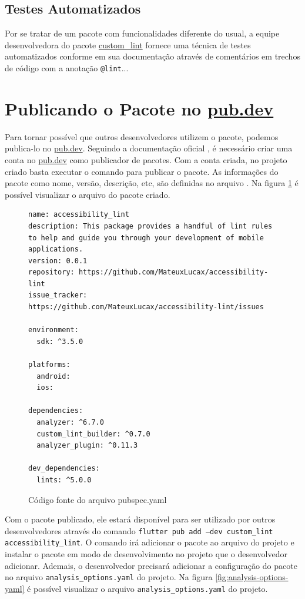 \subsection{Testes Automatizados}

Por se tratar de um pacote com funcionalidades diferente do usual, a equipe desenvolvedora do pacote \href{https://pub.dev/packages/custom_lint}{custom\_lint} fornece uma técnica de testes automatizados conforme em sua documentação \cite{customlintbuilder} através de comentários em trechos de código com a anotação \texttt{@lint}...

\section{Publicando o Pacote no \href{https://pub.dev/}{pub.dev}}

Para tornar possível que outros desenvolvedores utilizem o pacote, podemos publica-lo no \href{https://pub.dev/}{pub.dev}. Seguindo a documentação oficial \cite{pubdotdevpublish}, é necessário criar uma conta no \href{https://pub.dev/}{pub.dev} como publicador de pacotes. Com a conta criada, no projeto criado basta executar o comando  para publicar o pacote. As informações do pacote como nome, versão, descrição, etc, são definidas no arquivo . Na figura \ref{fig:pubspec-yaml} é possível visualizar o arquivo  do pacote criado.

\begin{figure}[!htbp]
\centering
\caption{Código fonte do arquivo pubspec.yaml}\label{fig:pubspec-yaml}
\begin{lstlisting}
name: accessibility_lint
description: This package provides a handful of lint rules to help and guide you through your development of mobile applications.
version: 0.0.1
repository: https://github.com/MateuxLucax/accessibility-lint
issue_tracker: https://github.com/MateuxLucax/accessibility-lint/issues

environment:
  sdk: ^3.5.0

platforms:
  android:
  ios:

dependencies:
  analyzer: ^6.7.0
  custom_lint_builder: ^0.7.0
  analyzer_plugin: ^0.11.3

dev_dependencies:
  lints: ^5.0.0
\end{lstlisting}
\vspace{2mm}
\end{figure}

Com o pacote publicado, ele estará disponível para ser utilizado por outros desenvolvedores através do comando \texttt{flutter pub add --dev custom\_lint accessibility\_lint}. O comando irá adicionar o pacote ao arquivo  do projeto e instalar o pacote em modo de desenvolvimento no projeto que o desenvolvedor adicionar. Ademais, o desenvolvedor precisará adicionar a configuração do pacote no arquivo \texttt{analysis\_options.yaml} do projeto. Na figura \ref{fig:analysis-options-yaml} é possível visualizar o arquivo \texttt{analysis\_options.yaml} do projeto.

